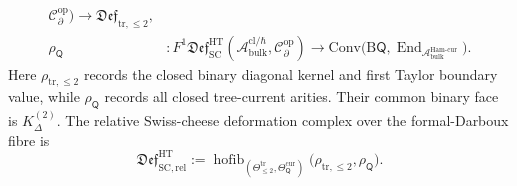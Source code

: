 \begin{defn}
\[\begin{aligned}
   \mathcal C^{\mathrm{op}}_\partial)
  \longrightarrow
  \mathfrak{Def}_{\mathrm{tr},\leq2},\\
  \rho_{\mathsf Q}&\colon
  F^1\mathfrak{Def}^{\mathrm{HT}}_{\mathrm{SC}}
  (\mathcal A^{\mathrm{cl}/\hbar}_{\mathrm{bulk}},
   \mathcal C^{\mathrm{op}}_\partial)
  \longrightarrow
  \mathrm{Conv}\bigl(\mathrm B\mathsf Q,
    \operatorname{End}_{\mathcal A^{\mathrm{Ham\mbox{-}cur}}_{\mathrm{bulk}}}
  \bigr).
\end{aligned}
\]
Here \(\rho_{\mathrm{tr},\leq2}\) records the closed binary diagonal
kernel and first Taylor boundary value, while \(\rho_{\mathsf Q}\) records
all closed tree-current arities.  Their common binary face is
\(K^{(2)}_\Delta\).  The relative Swiss-cheese deformation complex over
the formal-Darboux fibre is
\[
  \mathfrak{Def}^{\mathrm{HT}}_{\mathrm{SC,rel}}
  :=
  \operatorname{hofib}_{(\Theta^{\mathrm{tr}}_{\leq2},
  \Theta_{\mathsf Q}^{\mathrm{cur}})}
  \bigl(\rho_{\mathrm{tr},\leq2},\rho_{\mathsf Q}\bigr).
\]


\end{defn}
